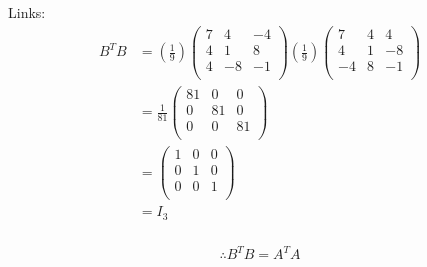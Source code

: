 \documentclass{standalone}
\begin{document}
\begin{enumerate}[a)]
    Links:
    \begin{align*}
        B^TB &= \left(\frac{1}{9}\right)\left(\begin{array}{rrr}
        7 & 4 & -4 \\
        4 & 1 & 8 \\
        4 & -8 & -1 \\
        \end{array}\right)\left(\frac{1}{9}\right)\left(\begin{array}{rrr}
        7 & 4 & 4 \\
        4 & 1 & -8 \\
        -4 & 8 & -1 \\
        \end{array}\right) \\
        &= \frac{1}{81}\left(\begin{array}{rrr}
        81 & 0 & 0 \\
        0 & 81 & 0 \\
        0 & 0 & 81 \\
        \end{array}\right) \\
        &= \left(\begin{array}{rrr}
        1 & 0 & 0 \\
        0 & 1 & 0 \\
        0 & 0 & 1 \\
        \end{array}\right) \\
        &= I_3 \\
    \end{align*}

    \begin{align*}
        \therefore B^TB=A^TA
    \end{align*}

\end{enumerate}
\end{document}
